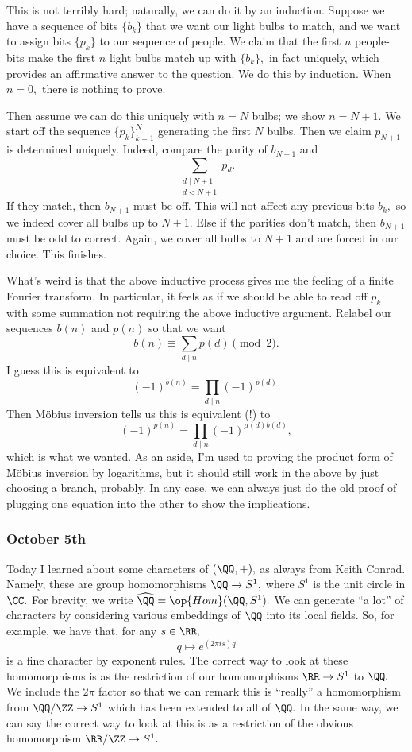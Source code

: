This is not terribly hard; naturally, we can do it by an induction. Suppose we have a sequence of bits $\{b_k\}$ that we want our light bulbs to match, and we want to assign bits $\{p_k\}$ to our sequence of people. We claim that the first $n$ people-bits make the first $n$ light bulbs match up with $\{b_k\},$ in fact uniquely, which provides an affirmative answer to the question. We do this by induction. When $n=0,$ there is nothing to prove.

Then assume we can do this uniquely with $n=N$ bulbs; we show $n=N+1.$ We start off the sequence $\{p_k\}_{k=1}^N$ generating the first $N$ bulbs. Then we claim $p_{N+1}$ is determined uniquely. Indeed, compare the parity of $b_{N+1}$ and
\[\sum_{\substack{d\mid N+1\\d<N+1}}p_d.\]
If they match, then $b_{N+1}$ must be off. This will not affect any previous bits $b_k,$ so we indeed cover all bulbs up to $N+1.$ Else if the parities don't match, then $b_{N+1}$ must be odd to correct. Again, we cover all bulbs to $N+1$ and are forced in our choice. This finishes.

What's weird is that the above inductive process gives me the feeling of a finite Fourier transform. In particular, it feels as if we should be able to read off $p_k$ with some summation not requiring the above inductive argument. Relabel our sequences $b(n)$ and $p(n)$ so that we want
\[b(n)\equiv\sum_{d\mid n}p(d)\pmod2.\]
I guess this is equivalent to
\[(-1)^{b(n)}=\prod_{d\mid n}(-1)^{p(d)}.\]
Then M\"obius inversion tells us this is equivalent (!) to
\[(-1)^{p(n)}=\prod_{d\mid n}(-1)^{\mu(d)b(d)},\]
which is what we wanted. As an aside, I'm used to proving the product form of M\"obius inversion by logarithms, but it should still work in the above by just choosing a branch, probably. In any case, we can always just do the old proof of plugging one equation into the other to show the implications.

\subsubsection{October 5th}
Today I learned about some characters of $(\QQ,+),$ as always from Keith Conrad. Namely, these are group homomorphisms $\QQ\to S^1,$ where $S^1$ is the unit circle in $\CC.$ For brevity, we write $\widehat\QQ=\op{Hom}(\QQ,S^1).$ We can generate ``a lot'' of characters by considering various embeddings of $\QQ$ into its local fields. So, for example, we have that, for any $s\in\RR,$
\[q\mapsto e^{(2\pi is)q}\]
is a fine character by exponent rules. The correct way to look at these homomorphisms is as the restriction of our homomorphisms $\RR\to S^1$ to $\QQ.$ We include the $2\pi$ factor so that we can remark this is ``really'' a homomorphism from $\QQ/\ZZ\to S^1$ which has been extended to all of $\QQ.$ In the same way, we can say the correct way to look at this is as a restriction of the obvious homomorphism $\RR/\ZZ\to S^1.$

